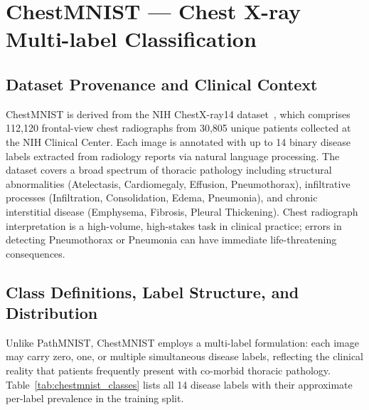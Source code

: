 \section{ChestMNIST — Chest X-ray Multi-label Classification}

\subsection{Dataset Provenance and Clinical Context}

ChestMNIST is derived from the NIH ChestX-ray14 dataset~\cite{wang2017chestx}, which comprises 112,120 frontal-view chest radiographs from 30,805 unique patients collected at the NIH Clinical Center. Each image is annotated with up to 14 binary disease labels extracted from radiology reports via natural language processing. The dataset covers a broad spectrum of thoracic pathology including structural abnormalities (Atelectasis, Cardiomegaly, Effusion, Pneumothorax), infiltrative processes (Infiltration, Consolidation, Edema, Pneumonia), and chronic interstitial disease (Emphysema, Fibrosis, Pleural Thickening). Chest radiograph interpretation is a high-volume, high-stakes task in clinical practice; errors in detecting Pneumothorax or Pneumonia can have immediate life-threatening consequences.

\subsection{Class Definitions, Label Structure, and Distribution}

Unlike PathMNIST, ChestMNIST employs a multi-label formulation: each image may carry zero, one, or multiple simultaneous disease labels, reflecting the clinical reality that patients frequently present with co-morbid thoracic pathology. Table~\ref{tab:chestmnist_classes} lists all 14 disease labels with their approximate per-label prevalence in the training split.

